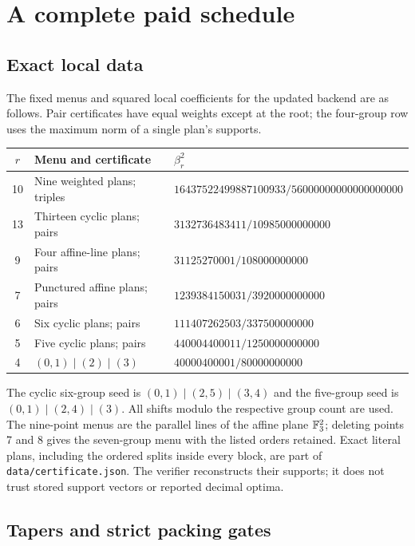 \section{A complete paid schedule}
\label{sec:schedule}

\subsection{Exact local data}

The fixed menus and squared local coefficients for the updated backend are
as follows. Pair certificates have equal weights except at the root; the
four-group row uses the maximum norm of a single plan's supports.

\begin{center}\small
\begin{tabular}{@{}cll@{}}
\toprule $r$ & Menu and certificate & $\beta_r^2$\\
\midrule
10 & Nine weighted plans; triples & $16437522499887100933/56000000000000000000$\\
13 & Thirteen cyclic plans; pairs & $3132736483411/10985000000000$\\
9 & Four affine-line plans; pairs & $31125270001/108000000000$\\
7 & Punctured affine plans; pairs & $1239384150031/3920000000000$\\
6 & Six cyclic plans; pairs & $111407262503/337500000000$\\
5 & Five cyclic plans; pairs & $440004400011/1250000000000$\\
4 & $(0,1)\mid(2)\mid(3)$ & $40000400001/80000000000$\\
\bottomrule
\end{tabular}
\end{center}

The cyclic six-group seed is $(0,1)\mid(2,5)\mid(3,4)$ and the
five-group seed is $(0,1)\mid(2,4)\mid(3)$. All shifts modulo the
respective group count are used. The nine-point menus are the parallel
lines of the affine plane $\mathbb F_3^2$; deleting points 7 and 8 gives the
seven-group menu with the listed orders retained. Exact literal plans,
including the ordered splits inside every block, are part of
\texttt{data/certificate.json}. The verifier reconstructs their supports;
it does not trust stored support vectors or reported decimal optima.

\subsection{Tapers and strict packing gates}

